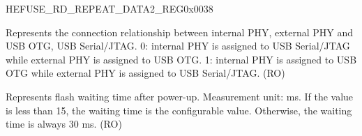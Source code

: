 \begin{register}{H}{EFUSE\_RD\_REPEAT\_DATA2\_REG}{0x{}0038}
\begin{regdesc}
\begin{reglist}
\label{fielddesc:EFUSEUSBPHYSEL}\item [EFUSE\_USB\_PHY\_SEL] Represents the connection relationship between internal PHY, external PHY and USB OTG, USB Serial/JTAG. 0: internal PHY is assigned to USB Serial/JTAG while external PHY is assigned to USB OTG. 1: internal PHY is assigned to USB OTG while external PHY is assigned to USB Serial/JTAG. (RO)
\label{fielddesc:EFUSEFLASHTPUW}\item [EFUSE\_FLASH\_TPUW] Represents flash waiting time after power-up. Measurement unit: ms. If the value is less than 15, the waiting time is the configurable value. Otherwise, the waiting time is always 30 ms. (RO)
\end{reglist}\end{regdesc}
\end{register}


